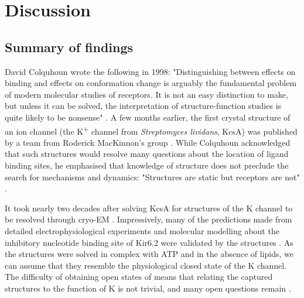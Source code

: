 \chapter{\label{ch:7}Discussion} 

\graphicspath{{figures/ch7/}}

\minitoc

\section{Summary of findings}

David Colquhoun wrote the following in 1998:
"Distinguishing between effects on binding and effects on conformation change is arguably the fundamental problem of modern molecular studies of receptors.
It is not an easy distinction to make, but unless it can be solved, the interpretation of structure‐function studies is quite likely to be nonsense" \cite{colquhoun_binding_1998}.
A few months earlier, the first crystal structure of an ion channel (the K\textsuperscript{+} channel from \textit{Streptomyces lividans}, KcsA) was published by a team from Roderick MacKinnon's group \cite{doyle_structure_1998}.
While Colquhoun acknowledged that such structures would resolve many questions about the location of ligand binding sites, he emphasised that knowledge of structure does not preclude the search for mechanisms and dynamics: "Structures are static but receptors are not" \cite{colquhoun_binding_1998}.

It took nearly two decades after solving KcsA for structures of the K\ATP{} channel to be resolved through cryo-EM \cite{lee_molecular_2017, martin_anti-diabetic_2017-1, li_structure_2017-1, martin_mechanism_2019-1}.
Impressively, many of the predictions made from detailed electrophysiological experiments and molecular modelling about the inhibitory nucleotide binding site of Kir6.2 were validated by the structures \cite{tucker_molecular_1998, drain_katp_1998, li_i182_2000, cukras_structural_2002, cukras_role_2002, trapp_identification_2003, li_ligand-dependent_2005, antcliff_functional_2005, haider_identification_2007}.
As the structures were solved in complex with ATP and in the absence of lipids, we can assume that they resemble the physiological closed state of the K\ATP{} channel.
The difficulty of obtaining open states of  means that relating the captured structures to the function of K\ATP{} is not trivial, and many open questions remain \cite{puljung_cryo-electron_2018}.

